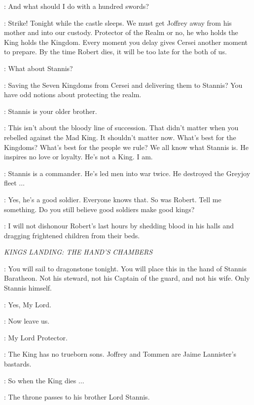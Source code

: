 \NED: And what should I do with a hundred swords? 

\RENLY: Strike! Tonight while the castle sleeps. We must get Joffrey away from his mother and into our custody. Protector of the Realm or no, he who holds the King holds the Kingdom. Every moment you delay gives Cersei another moment to prepare. By the time Robert dies, it will be too late for the both of us. 

\NED: What about Stannis? 

\RENLY: Saving the Seven Kingdoms from Cersei and delivering them to Stannis? You have odd notions about protecting the realm. 

\NED: Stannis is your older brother. 

\RENLY: This isn't about the bloody line of succession. That didn't matter when you rebelled against the Mad King. It shouldn't matter now. What's best for the Kingdoms? What's best for the people we rule? We all know what Stannis is. He inspires no love or loyalty. He's not a King. I am. 

\NED: Stannis is a commander. He's led men into war twice. He destroyed the Greyjoy fleet $\ldots$ 

\RENLY: Yes, he's a good soldier. Everyone knows that. So was Robert. Tell me something. Do you still believe good soldiers make good kings? 

\NED: I will not dishonour Robert's last hours by shedding blood in his halls and dragging frightened children from their beds. 


\scene

\textit{KINGS LANDING: THE HAND'S CHAMBERS} 


\NED: You will sail to dragonstone tonight. You will place this in the hand of Stannis Baratheon. Not his steward, not his Captain of the guard, and not his wife. Only Stannis himself. 

\BANNERMAN: Yes, My Lord. 


\NED: Now leave us. 

\LITTLEFINGER:  My Lord Protector. 

\NED: The King has no trueborn sons. Joffrey and Tommen are Jaime Lannister's bastards. 

\LITTLEFINGER: So when the King dies $\ldots$ 

\NED: The throne passes to his brother Lord Stannis. 


